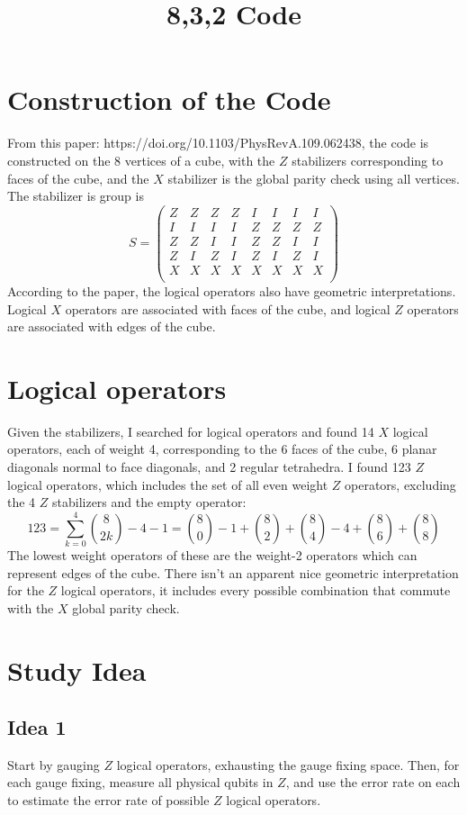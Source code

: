 \documentclass{article}
\title{8,3,2 Code}
\begin{document}
\section{Construction of the Code}
From this paper: https://doi.org/10.1103/PhysRevA.109.062438, the code is constructed on the 8 vertices of a cube, with the $Z$ stabilizers corresponding to faces of the cube, and the $X$ stabilizer is the global parity check using all vertices. The stabilizer is group is
\[S = \begin{pmatrix}
    Z & Z & Z & Z & I & I & I & I\\
    I & I & I & I & Z & Z & Z & Z\\
    Z & Z & I & I & Z & Z & I & I\\
    Z & I & Z & I & Z & I & Z & I\\
    X & X & X & X & X & X & X & X\\
\end{pmatrix}\]
According to the paper, the logical operators also have geometric interpretations. Logical $X$ operators are associated with faces of the cube, and logical $Z$ operators are associated with edges of the cube.

\section{Logical operators}
Given the stabilizers, I searched for logical operators and found 14 $X$ logical operators, each of weight 4, corresponding to the 6 faces of the cube, 6 planar diagonals normal to face diagonals, and 2 regular tetrahedra. I found 123 $Z$ logical operators, which includes the set of all even weight $Z$ operators, excluding the 4 $Z$ stabilizers and the empty operator:
\[123 = \sum_{k=0}^4 \binom{8}{2k} - 4 - 1= {8\choose0} - 1 + {8\choose2} + {8\choose4} - 4 + {8\choose6} + {8\choose8}\]
The lowest weight operators of these are the weight-2 operators which can represent edges of the cube. There isn't an apparent nice geometric interpretation for the $Z$ logical operators, it includes every possible combination that commute with the $X$ global parity check.

\section{Study Idea}
\subsection{Idea 1}
Start by gauging $Z$ logical operators, exhausting the gauge fixing space. Then, for each gauge fixing, measure all physical qubits in $Z$, and use the error rate on each to estimate the error rate of possible $Z$ logical operators.
\end{document}
